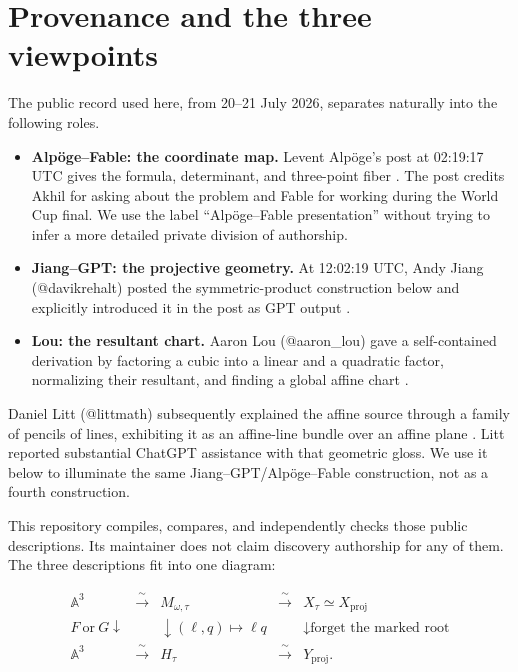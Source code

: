 \documentclass[11pt,a4paper]{article}
\theoremstyle{remark}
\newcommand{\A}{\mathbb A}
\begin{document}
\section{Provenance and the three viewpoints}

The public record used here, from 20--21 July 2026, separates naturally into the
following roles.

\begin{itemize}
\item \textbf{Alp\"oge--Fable: the coordinate map.}
  Levent Alp\"oge's post at 02:19:17 UTC gives the formula, determinant, and
  three-point fiber \cite{Alpoge}.  The post credits Akhil for asking about
  the problem and Fable for working during the World Cup final.  We use the
  label ``Alp\"oge--Fable presentation'' without trying to infer a more
  detailed private division of authorship.
\item \textbf{Jiang--GPT: the projective geometry.}
  At 12:02:19 UTC, Andy Jiang (@davikrehalt) posted the symmetric-product
  construction below and explicitly introduced it in the post as GPT output
  \cite{Jiang}.
\item \textbf{Lou: the resultant chart.}
  Aaron Lou (@aaron\_lou) gave a self-contained derivation by factoring a cubic into a
  linear and a quadratic factor, normalizing their resultant, and finding a
  global affine chart \cite{Lou}.
\end{itemize}

Daniel Litt (@littmath) subsequently explained the affine source through a
family of pencils of lines, exhibiting it as an affine-line bundle over an
affine plane \cite{LittBundle}.  Litt reported substantial ChatGPT assistance
with that geometric gloss.  We use it below to illuminate the same
Jiang--GPT/Alp\"oge--Fable construction, not as a fourth construction.

This repository compiles, compares, and independently checks those public
descriptions.  Its maintainer does not claim discovery authorship for any of
them.  The three descriptions fit into one diagram:

\[
\begin{array}{ccccc}
\A^3
&\xrightarrow{\ \sim\ }&
M_{\omega,\tau}
&\xrightarrow{\ \sim\ }&
X_\tau\simeq X_{\mathrm{proj}}
\\[-1mm]
{\scriptstyle F\ \text{or}\ G}\downarrow
&&\downarrow{\scriptstyle (\ell,q)\mapsto\ell q}
&&\downarrow{\scriptstyle\text{forget the marked root}}
\\[-1mm]
\A^3
&\xrightarrow{\ \sim\ }&
H_\tau
&\xrightarrow{\ \sim\ }&
Y_{\mathrm{proj}}.
\end{array}
\tag{1.1}
\]
\end{document}
